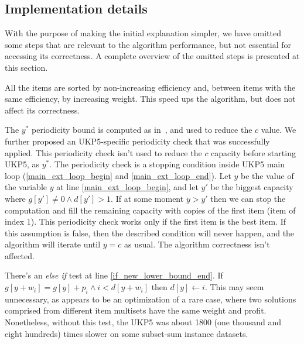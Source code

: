 \documentclass[runningheads,a4paper]{llncs}
\begin{document}
\subsection{Implementation details}

With the purpose of making the initial explanation simpler, we have omitted some steps that are relevant to the algorithm performance, but not essential for accessing its correctness. 
A complete overview of the omitted steps is presented at this section.

All the items are sorted by non-increasing efficiency and, between items with the same efficiency, by increasing weight. 
This speed ups the algorithm, but does not affect its correctness.

The \(y^{*}\) periodicity bound is computed as in~\cite[p. 223]{gar72}, and used to reduce the \(c\) value. 
We further proposed an UKP5-specific periodicity check that was successfully applied. 
This periodicity check isn't used to reduce the \(c\) capacity before starting UKP5, as \(y^{*}\). 
The periodicity check is a stopping condition inside UKP5 main loop (\ref{main_ext_loop_begin} and \ref{main_ext_loop_end}). 
Let \(y\) be the value of the variable \(y\) at line \ref{main_ext_loop_begin}, and let \(y'\) be the biggest capacity where \(g[y'] \neq 0 \land d[y'] > 1\). 
If at some moment \(y > y'\) then we can stop the computation and fill the remaining capacity with copies of the first item (item of index \(1\)).
This periodicity check works only if the first item is the best item. 
If this assumption is false, then the described condition will never happen, and the algorithm will iterate until \(y = c\) as usual. The algorithm correctness isn't affected.

There's an \emph{else if} test at line \ref{if_new_lower_bound_end}. 
If \(g[y + w_i] = g[y] + p_i \land i < d[y + w_i]\) then \(d[y] \gets i\). 
This may seem unnecessary, as appears to be an optimization of a rare case, where two solutions comprised from different item multisets have the same weight and profit. 
Nonetheless, without this test, the UKP5 was about 1800 (one thousand and eight hundreds) times slower on some subset-sum instance datasets.
\end{document}
